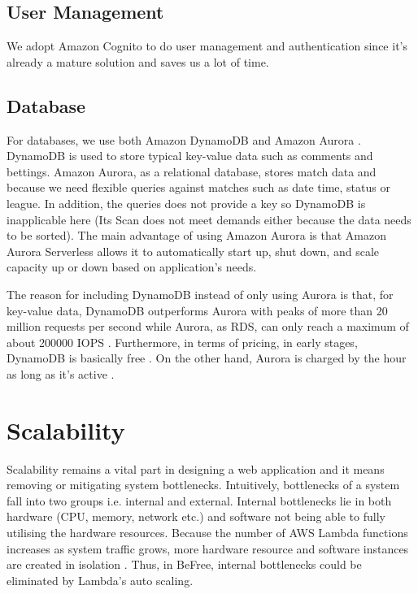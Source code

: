 \documentclass[conference]{IEEEtran}
\begin{document}
\subsection{User Management}
We adopt Amazon Cognito \cite{b8} to do user management and authentication since it's already a mature solution and saves us a lot of time.

\subsection{Database}
For databases, we use both Amazon DynamoDB \cite{b9} and Amazon Aurora \cite{b10}. DynamoDB is used to store typical key-value data such as comments and bettings. Amazon Aurora, as a relational database, stores match data and because we need flexible queries against matches such as date time, status or league. In addition, the queries does not provide a key so DynamoDB is inapplicable here (Its Scan does not meet demands either because the data needs to be sorted). The main advantage of using Amazon Aurora is that Amazon Aurora Serverless \cite{b11} allows it to automatically start up, shut down, and scale capacity up or down based on application's needs.

The reason for including DynamoDB instead of only using Aurora is that, for key-value data, DynamoDB outperforms Aurora with peaks of more than 20 million requests per second \cite{b9} while Aurora, as RDS, can only reach a maximum of about 200000 IOPS \cite{b12} \cite{b13}. Furthermore, in terms of pricing, in early stages, DynamoDB is basically free \cite{b14}. On the other hand, Aurora is charged by the hour as long as it's active \cite{b15}.

\section{Scalability}
Scalability remains a vital part in designing a web application and it means removing or mitigating system bottlenecks. Intuitively, bottlenecks of a system fall into two groups i.e. internal and external. Internal bottlenecks lie in both hardware (CPU, memory, network etc.) and software not being able to fully utilising the hardware resources. Because the number of AWS Lambda functions increases as system traffic grows, more hardware resource and software instances are created in isolation \cite{b14}. Thus, in BeFree, internal bottlenecks could be eliminated by Lambda's auto scaling.
\end{document}
